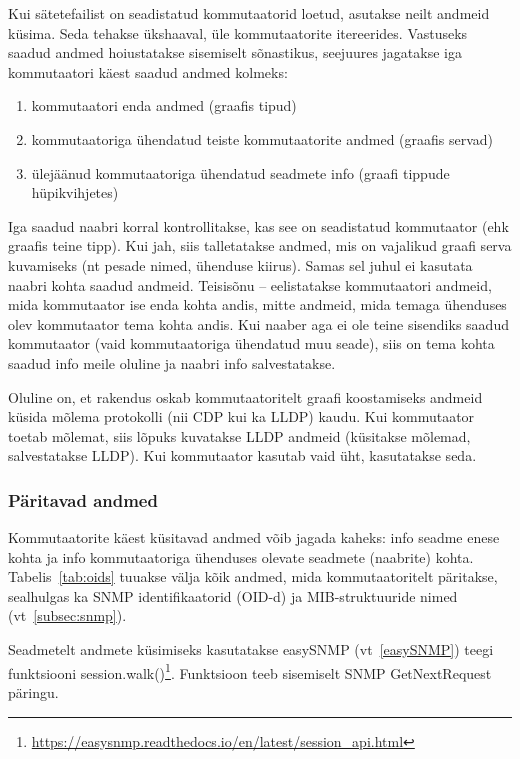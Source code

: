 \documentclass[12pt]{article}
\begin{document}
Kui sätetefailist on seadistatud kommutaatorid loetud, asutakse neilt andmeid küsima.
Seda tehakse ükshaaval, üle kommutaatorite itereerides.
Vastuseks saadud andmed hoiustatakse sisemiselt sõnastikus, seejuures jagatakse iga
kommutaatori käest saadud andmed kolmeks:
\begin{enumerate}
    \item kommutaatori enda andmed (graafis tipud)
    \item kommutaatoriga ühendatud teiste kommutaatorite andmed (graafis servad)
    \item ülejäänud kommutaatoriga ühendatud seadmete info (graafi tippude hüpikvihjetes)
\end{enumerate}
Iga saadud naabri korral kontrollitakse, kas see on seadistatud kommutaator (ehk graafis teine
tipp).
Kui jah, siis talletatakse andmed, mis on vajalikud graafi serva kuvamiseks (nt pesade nimed,
ühenduse kiirus).
Samas sel juhul ei kasutata naabri kohta saadud andmeid.
Teisisõnu -- eelistatakse kommutaatori andmeid, mida kommutaator ise enda kohta andis,
mitte andmeid, mida temaga ühenduses olev kommutaator tema kohta andis.
Kui naaber aga ei ole teine sisendiks saadud kommutaator (vaid kommutaatoriga ühendatud muu seade),
siis on tema kohta saadud info meile oluline ja naabri info salvestatakse.

Oluline on, et rakendus oskab kommutaatoritelt graafi koostamiseks andmeid küsida mõlema
protokolli (nii CDP kui ka LLDP) kaudu.
Kui kommutaator toetab mõlemat, siis lõpuks kuvatakse LLDP andmeid (küsitakse mõlemad,
salvestatakse LLDP).
Kui kommutaator kasutab vaid üht, kasutatakse seda.

\subsubsection{Päritavad andmed} \label{dataAsked}
Kommutaatorite käest küsitavad andmed võib jagada kaheks: info seadme enese kohta ja info
kommutaatoriga ühenduses olevate seadmete (naabrite) kohta.
Tabelis~\ref{tab:oids} tuuakse välja kõik andmed, mida kommutaatoritelt päritakse, sealhulgas ka SNMP
identifikaatorid (OID-d) ja MIB-struktuuride nimed (vt~\ref{subsec:snmp}).

Seadmetelt andmete küsimiseks kasutatakse easySNMP (vt~\ref{easySNMP}) teegi funktsiooni
session.walk()\footnote{\url{https://easysnmp.readthedocs.io/en/latest/session\_api.html}}.
Funktsioon teeb sisemiselt SNMP GetNextRequest päringu.
\end{document}
